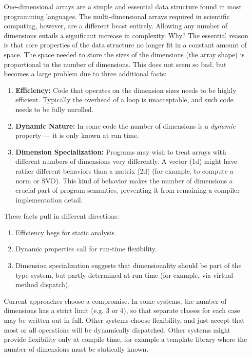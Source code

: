 \documentclass[preprint]{sigplanconf}
\begin{document}
One-dimensional arrays are a simple and essential data structure found in most
programming languages. The multi-dimensional arrays required in scientific
computing, however, are a different beast entirely. Allowing any number of
dimensions entails a significant increase in complexity. Why? The essential
reason is that core properties of the data structure no longer fit in a
constant amount of space. The space needed to store the sizes of the
dimensions (the array shape) is proportional to the number of dimensions. This
does not seem so bad, but becomes a large problem due to three additional
facts:

\begin{enumerate}

\item{\bf Efficiency:} Code that operates on the dimension sizes needs to be
highly efficient. Typically the overhead of a loop is unacceptable, and such
code needs to be fully unrolled.

\item{\bf Dynamic Nature:} In some code the number of dimensions is a
\emph{dynamic} property --- it is only known at run time.

\item {\bf Dimension Specialization:} Programs may wish to treat arrays with
different numbers of dimensions very differently. A vector (1d) might have
rather different behaviors than a matrix (2d) (for example, to compute a norm
or SVD). This kind of behavior makes the number of dimensions a crucial part
of program semantics, preventing it from remaining a compiler implementation
detail.

\end{enumerate}

These facts pull in different directions:

\begin{enumerate}

\item Efficiency begs for static analysis.

\item Dynamic properties call for run-time flexibility. 

\item Dimension specialization suggests that dimensionality should be part of the type system, but partly determined at run time (for example, via virtual method dispatch).

\end{enumerate}

Current approaches choose a compromise. In some systems, the number of
dimensions has a strict limit (e.g. 3 or 4), so that separate classes for each
case may be written out in full. Other systems choose flexibility, and just
accept that most or all operations will be dynamically dispatched. Other
systems might provide flexibility only at compile time, for example a template
library where the number of dimensions must be statically known.
\end{document}
